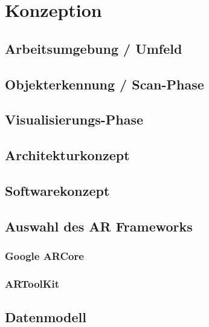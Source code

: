 
\chapter{Konzeption}
\section{Arbeitsumgebung / Umfeld}

\section{Objekterkennung / Scan-Phase}
\section{Visualisierungs-Phase}

\section{Architekturkonzept}
\section{Softwarekonzept}

\section{Auswahl des AR Frameworks}
\subsection{Google ARCore}
\subsection{ARToolKit}

\section{Datenmodell}